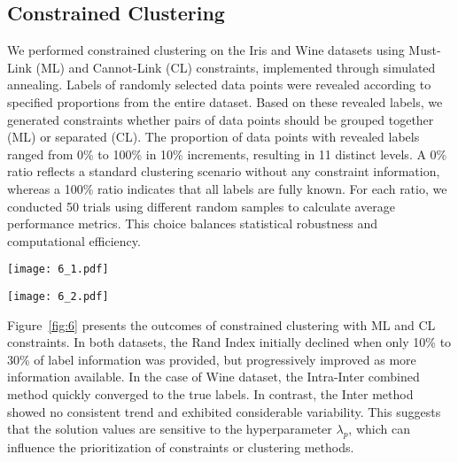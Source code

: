 \documentclass[showpacs,twocolumn,superscriptaddress]{revtex4-2}
\begin{document}
\subsection{Constrained Clustering}
We performed constrained clustering on the Iris and Wine datasets using Must-Link (ML) and Cannot-Link (CL) constraints, implemented through simulated annealing. Labels of randomly selected data points were revealed according to specified proportions from the entire dataset. Based on these revealed labels, we generated constraints whether pairs of data points should be grouped together (ML) or separated (CL). The proportion of data points with revealed labels ranged from 0\% to 100\% in 10\% increments, resulting in 11 distinct levels. A 0\% ratio reflects a standard clustering scenario without any constraint information, whereas a 100\% ratio indicates that all labels are fully known. For each ratio, we conducted 50 trials using different random samples to calculate average performance metrics. This choice balances statistical robustness and computational efficiency.
\begin{figure*}[!ht]
  \begin{minipage}[b]{0.5\textwidth}
    \centering
    \texttt{[image: 6\_1.pdf]}
  \end{minipage}%
  \begin{minipage}[b]{0.5\textwidth}
    \centering
    \texttt{[image: 6\_2.pdf]}
  \end{minipage}
  \caption{The plots display the Rand Index as a function of the percentage of known labels for the Iris (left) and Wine (right) datasets, under constrained clustering with Must-Link (ML) and Cannot-Link (CL) constraints. Where the proportion of revealed labels ranges from 0\% to 100\% in 10\% increments. The performance improves as more label information is revealed, with the both dataset showing a recovery in performance after an initial decline between 10\% and 30\%. The variability in the Inter method suggests sensitivity to the hyperparameter $\lambda_p$.}
  \label{fig:6}
\end{figure*}

Figure~\ref{fig:6} presents the outcomes of constrained clustering with ML and CL constraints. In both datasets, the Rand Index initially declined when only 10\% to 30\% of label information was provided, but progressively improved as more information available. In the case of Wine dataset, the Intra-Inter combined method quickly converged to the true labels. In contrast, the Inter method showed no consistent trend and exhibited considerable variability. This suggests that the solution values are sensitive to the hyperparameter $\lambda_p$, which can influence the prioritization of constraints or clustering methods.
\end{document}
